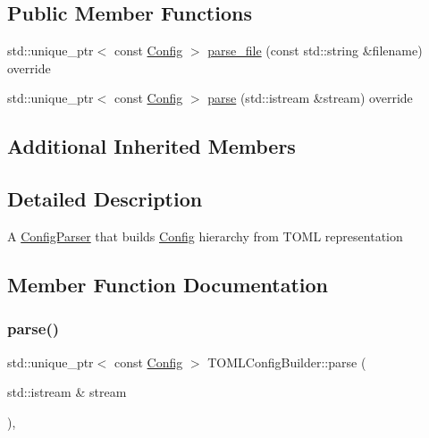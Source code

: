 \subsection*{Public Member Functions}
\begin{DoxyCompactItemize}
\item 
std\+::unique\+\_\+ptr$<$ const \hyperlink{classtheoria_1_1config_1_1Config}{Config} $>$ \hyperlink{classtheoria_1_1config_1_1TOMLConfigBuilder_afba5445b56e12b39cf1b266627a27f58}{parse\+\_\+file} (const std\+::string \&filename) override
\item 
std\+::unique\+\_\+ptr$<$ const \hyperlink{classtheoria_1_1config_1_1Config}{Config} $>$ \hyperlink{classtheoria_1_1config_1_1TOMLConfigBuilder_ac5a36aebe769d67decc9946ee2a3fbc3}{parse} (std\+::istream \&stream) override
\end{DoxyCompactItemize}
\subsection*{Additional Inherited Members}


\subsection{Detailed Description}
A \hyperlink{classtheoria_1_1config_1_1ConfigParser}{Config\+Parser} that builds \hyperlink{classtheoria_1_1config_1_1Config}{Config} hierarchy from T\+O\+ML representation 

\subsection{Member Function Documentation}
\mbox{\label{classtheoria_1_1config_1_1TOMLConfigBuilder_ac5a36aebe769d67decc9946ee2a3fbc3}} 
\subsubsection{\texorpdfstring{parse()}{parse()}}
{\footnotesize\ttfamily std\+::unique\+\_\+ptr$<$ const \hyperlink{classtheoria_1_1config_1_1Config}{Config} $>$ T\+O\+M\+L\+Config\+Builder\+::parse (\begin{DoxyParamCaption}\item[{std\+::istream \&}]{stream }\end{DoxyParamCaption})\hspace{0.3cm}{\ttfamily [override]}, {\ttfamily [virtual]}}

